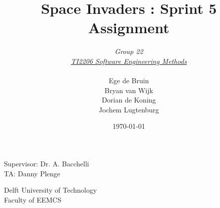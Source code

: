 \documentclass[10pt]{article}
\begin{document}
\title{Space Invaders : Sprint 5 Assignment}
\date{\today}
\author{\textit{Group 22}\\ \textit{\underline{TI2206 Software Engineering Methods}} \\
 \\Ege de Bruin \\ Bryan van Wijk \\ Dorian de Koning \\ Jochem Lugtenburg }
 \maketitle  
 \begin{center}
Supervisor: Dr. A. Bacchelli\\
TA: Danny Plenge\\
 \end{center}     
 \begin{center}
 Delft University of Technology\\
 Faculty of EEMCS\\
 \end{center}
 \thispagestyle{empty}
 \pagebreak

\newpage

\newpage

\end{document}
